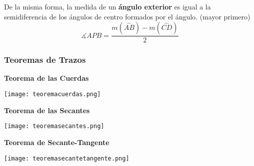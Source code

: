 De la misma forma, la medida de un \textbf{ángulo exterior} es igual a la semidiferencia de los ángulos de centro formados por el ángulo. (mayor primero)
\begin{equation*}
    \measuredangle APB = \frac{m(\stackrel\frown{AB}) - m(\stackrel\frown{CD})}{2}
\end{equation*}

\subsubsection{Teoremas de Trazos}
\textbf{Teorema de las Cuerdas}\\

\begin{center}
\texttt{[image: teoremacuerdas.png]}
\end{center}
\textbf{Teorema de las Secantes}\\
\begin{center}
\texttt{[image: teoremasecantes.png]}
\end{center}
\textbf{Teorema de Secante-Tangente}\\
\begin{center}
\texttt{[image: teoremasecantetangente.png]}
\end{center}